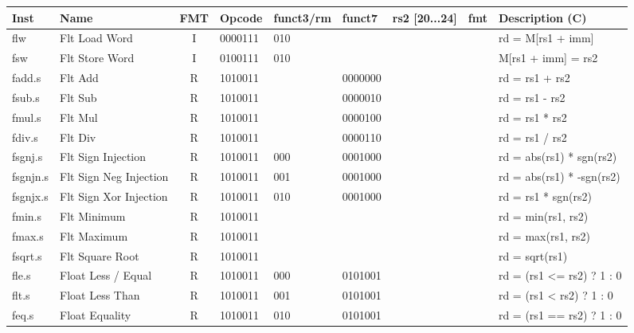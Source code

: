 \begin{center}
\begin{tabular}
{T | l | c | T | T | T | T | T | T } \hline
\rm Inst  & Name                  & FMT   & \rm Opcode & \rm funct3/rm & \rm funct7 & \rm rs2 [20...24] & \rm fmt & \rm Description (C)         \\ \hline
flw       & Flt Load Word         & I     & 0000111    & 010    &        &        & & rd = M[rs1 + imm]    \\
fsw       & Flt Store Word        & I     & 0100111    & 010    &        &        & & M[rs1 + imm] = rs2   \\
\hline
fadd.s    & Flt Add               & R     & 1010011    &        & 0000000 &        & & rd = rs1 + rs2       \\
fsub.s    & Flt Sub               & R     & 1010011    &        & 0000010 &        & & rd = rs1 - rs2       \\
fmul.s    & Flt Mul               & R     & 1010011    &        & 0000100 &        & & rd = rs1 * rs2       \\
fdiv.s    & Flt Div               & R     & 1010011    &        & 0000110 &        & & rd = rs1 / rs2       \\
fsgnj.s   & Flt Sign Injection    & R     & 1010011    & 000    & 0001000 &        & & rd = abs(rs1) * sgn(rs2) \\
fsgnjn.s  & Flt Sign Neg Injection& R     & 1010011    & 001    & 0001000 &        & & rd = abs(rs1) * -sgn(rs2) \\
fsgnjx.s  & Flt Sign Xor Injection& R     & 1010011    & 010    & 0001000 &        & & rd = rs1 * sgn(rs2)  \\
fmin.s    & Flt Minimum           & R     & 1010011    &        &         &        & & rd = min(rs1, rs2)   \\
fmax.s    & Flt Maximum           & R     & 1010011    &        &         &        & & rd = max(rs1, rs2)   \\
fsqrt.s   & Flt Square Root       & R     & 1010011    &        &         &        & & rd = sqrt(rs1)       \\
\hline
fle.s     & Float Less / Equal    & R     & 1010011    & 000    & 0101001 &        & & rd = (rs1 <= rs2) ? 1 : 0\\
flt.s     & Float Less Than       & R     & 1010011    & 001    & 0101001 &        & & rd = (rs1 <  rs2) ? 1 : 0 \\
feq.s     & Float Equality        & R     & 1010011    & 010    & 0101001 &        & & rd = (rs1 == rs2) ? 1 : 0 \\
\hline

\end{tabular}
\end{center}
